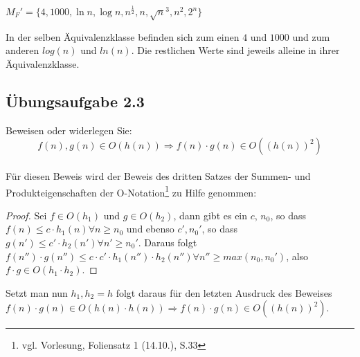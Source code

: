 \documentclass{article}
\begin{document}
\begin{flushright}
	$M_F' = \{4,1000,\operatorname{ln} n, \operatorname{log} n, n^{\frac{1}{2}}, n, \sqrt{n}^3, n^2, 2^n\}$
\end{flushright}
In der selben Äquivalenzklasse befinden sich zum einen $4$ und $1000$ und zum anderen $log(n)$ und $ln(n)$. Die restlichen Werte sind jeweils alleine in ihrer Äquivalenzklasse.
\\
\subsection{Übungsaufgabe 2.3}
\begin{flushright}
\begin{Large}
[~~~~\string| ~~2~]
\end{Large}
\end{flushright}
Beweisen oder widerlegen Sie:
\[
	f(n),g(n) \in O(h(n)) \Rightarrow f(n)\cdot g(n) \in O((h(n))^2)
\]
\vspace{1cm}\\
Für diesen Beweis wird der Beweis des dritten Satzes der Summen- und Produkteigenschaften der O-Notation\footnote{vgl. Vorlesung, Foliensatz 1 (14.10.), S.33} zu Hilfe genommen:
\begin{proof}
Sei $f\in O(h_1)$ und $g\in O(h_2)$, dann gibt es ein $c$, $n_0$, so dass $f(n) \leq c \cdot h_1(n) \forall n \geq n_0$ und ebenso $c', n_0'$, so dass $g(n') \leq c' \cdot h_2(n') \forall n' \geq n_0'$.
Daraus folgt $f(n'')\cdot g(n'') \leq c \cdot c' \cdot h_1(n'') \cdot h_2(n'') \forall n'' \geq max(n_0, n_0')$, also $f \cdot g \in O(h_1 \cdot h_2)$.
\end{proof}
Setzt man nun $h_1, h_2 = h$ folgt daraus für den letzten Ausdruck des Beweises $f(n) \cdot g(n) \in O(h(n) \cdot h(n)) \Rightarrow f(n) \cdot g(n) \in O((h(n))^2)$.
\end{document}

